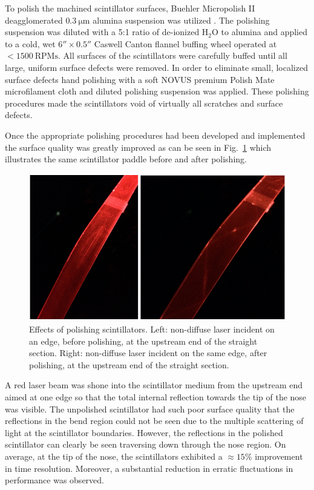 To polish the machined scintillator surfaces, Buehler Micropolish II deagglomerated $\mathrm{0.3\ \mu m}$ alumina suspension was utilized \cite{buehler}.  The polishing suspension was diluted with a 5:1 ratio of de-ionized $\mathrm{H_{2}O}$ to alumina and applied to a cold, wet $6'' \times 0.5''$ Caswell Canton flannel buffing wheel \cite{caswell} operated at $\mathrm{<1500~RPMs}$. All surfaces of the scintillators were carefully buffed until all large, uniform surface defects were removed. In order to eliminate small, localized surface defects hand polishing with a soft NOVUS premium Polish Mate microfilament cloth \cite{novus} and diluted polishing suspension was applied.  These polishing procedures made the scintillators void of virtually all scratches and surface defects.

Once the appropriate polishing procedures had been developed and implemented the surface quality was greatly improved as can be seen in Fig.~\ref{fig:polshing_effects} which illustrates the same scintillator paddle before and after polishing.
	\begin{figure}[!htb]
		\centering
		\includegraphics[width=1.0\columnwidth]{fabrication/figs/polshing_effects}
		\caption{Effects of polishing scintillators. Left: non-diffuse laser incident on an edge, before polishing, at the upstream end of the straight section. Right: non-diffuse laser incident on the same edge, after polishing, at the upstream end of the straight section.}
		\label{fig:polshing_effects}
	\end{figure}
A red laser beam was shone into the scintillator medium from the upstream end aimed at one edge so that the total internal reflection towards the tip of the nose was visible.  The unpolished scintillator had such poor surface quality that the reflections in the bend region could not be seen due to the multiple scattering of light at the scintillator boundaries.  However, the reflections in the polished scintillator can clearly be seen traversing down through the nose region.  On average, at the tip of the nose, the scintillators exhibited a $\approx15\%$ improvement in time resolution.  Moreover, a substantial reduction in erratic fluctuations in performance was observed.

